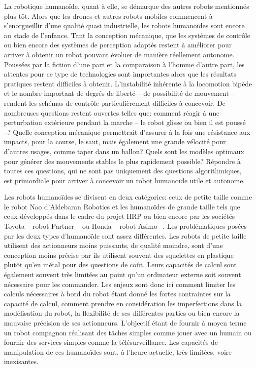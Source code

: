 La robotique humanoïde, quant à elle, se démarque des autres robots
mentionnés plus tôt. Alors que les drones et autres robots mobiles
commencent à s'enorgueillir d'une qualité quasi industrielle, les
robots humanoïdes sont encore au stade de l'enfance. Tant la
conception mécanique, que les systèmes de contrôle ou bien encore des
systèmes de perception adaptés restent à améliorer pour arriver à
obtenir un robot pouvant évoluer de manière réellement
autonome. Poussées par la fiction d'une part et la comparaison à
l'homme d'autre part, les attentes pour ce type de technologies sont
importantes alors que les résultats pratiques restent difficiles à
obtenir. L'instabilité inhérente à la locomotion bipède et le nombre
important de degrés de liberté -- de possibilité de mouvement --
rendent les schémas de contrôle particulièrement difficiles à
concevoir. De nombreuses questions restent ouvertes telles que:
comment réagir à une perturbation extérieure pendant la marche -- le
robot glisse ou bien il est poussé --? Quelle conception mécanique
permettrait d'assurer à la fois une résistance aux impacts, pour la
course, le saut, mais également une grande vélocité pour d'autres
usages, comme taper dans un ballon? Quels sont les modèles optimaux
pour générer des mouvements stables le plus rapidement possible?
Répondre à toutes ces questions, qui ne sont pas uniquement des
questions algorithmiques, est primordiale pour arriver à concevoir un
robot humanoïde utile et autonome.


Les robots humanoïdes se divisent en deux catégories: ceux de petite
taille comme le robot Nao d'Aldebaran Robotics et les humanoïdes de
grande taille tels que ceux développés dans le cadre du projet HRP ou
bien encore par les sociétés Toyota -- robot Partner -- ou Honda --
robot Asimo --. Les problématiques posées par les deux types
d'humanoïde sont assez différentes. Les robots de petite taille
utilisent des actionneurs moins puissants, de qualité moindre, sont
d'une conception moins précise par ils utilisent souvent des
squelettes en plastique plutôt qu'en métal pour des questions de
coût. Leurs capacités de calcul sont également souvent très limitées
au point qu'un ordinateur externe soit souvent nécessaire pour les
commander. Les enjeux sont donc ici comment limiter les calculs
nécessaires à bord du robot étant donné les fortes contraintes sur la
capacité de calcul, comment prendre en considération les imperfections
dans la modélisation du robot, la flexibilité de ses différentes
parties ou bien encore la mauvaise précision de ses
actionneurs. L'objectif étant de fournir à moyen terme un robot
compagnon réalisant des tâches simples comme jouer avec un humain ou
fournir des services simples comme la télésurveillance. Les capacités
de manipulation de ces humanoïdes sont, à l'heure actuelle, très
limitées, voire inexisantes.


